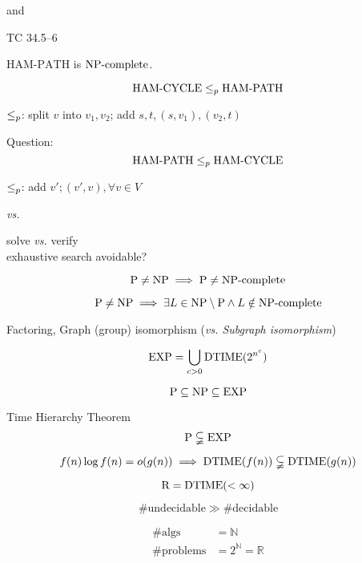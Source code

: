 \begin{frame}{\nph{} and \npc}
  \begin{exampleblock}{TC 34.5--6}
	\centerline{$\text{HAM-PATH}$ is $\text{NP-complete}$.}
  \end{exampleblock}

  \[
	\text{HAM-CYCLE} \le_{p} \text{HAM-PATH}
  \]

  \centerline{$\le_{p}$: split $v$ into $v_1, v_2$; add $s, t, (s,v_1), (v_2, t)$}

  \vspace{0.50cm}
  \begin{alertblock}{Question:}
	\[
	  \text{HAM-PATH} \le_{p} \text{HAM-CYCLE}
	\]

	\centerline{$\le_{p}$: add $v'; (v', v), \forall v \in V $}
  \end{alertblock}
\end{frame}
\begin{frame}{\p{} \emph{vs.} \np{}}
  \begin{center}
	solve \emph{vs.} verify \\[10pt]
	exhaustive search avoidable?
  \end{center}

  \[
	\text{P} \neq \text{NP} \implies \text{P} \neq \text{NP-complete}
  \]

  \begin{theorem}
	\[
	  \text{P} \neq \text{NP} \implies \exists L \in \text{NP} \setminus \text{P} \land L \notin \text{NP-complete}
	\]
  \end{theorem}

  \centerline{Factoring, Graph (group) isomorphism {\footnotesize (\emph{vs. Subgraph isomorphism})}}
\end{frame}
\begin{frame}{\expcls}
  \[
	\text{EXP} = \bigcup_{c > 0} \text{DTIME}(2^{n^c})
  \]

  \[
    \text{P} \subseteq \text{NP} \subseteq \text{EXP}
  \]
\end{frame}
\begin{frame}{Time Hierarchy Theorem}
  \[
	\text{P} \subsetneqq \text{EXP}
  \]

  \begin{theorem}
	\[
	  f(n) \log f(n) = o(g(n)) \implies \text{DTIME}(f(n)) \subsetneqq \text{DTIME}(g(n))
	\]
  \end{theorem}
\end{frame}
\begin{frame}{\rcls}
  \[
	\text{R} = \text{DTIME}(<\infty)
  \]

  \[
	\#\text{undecidable} \gg \#\text{decidable}
  \]

  \begin{align*}
	\#\text{algs} &= \mathbb{N} \\
	\#\text{problems} &= 2^{\mathbb{N}} = \mathbb{R}
  \end{align*}
\end{frame}
